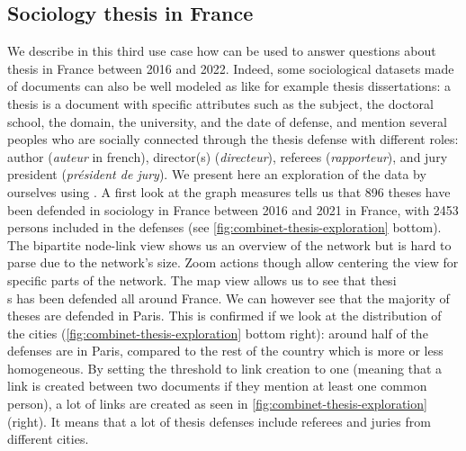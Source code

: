 \subsection{Sociology thesis in France}

We describe in this third use case how \name can be used to answer questions about thesis in France between 2016 and 2022.
Indeed, some sociological datasets made of documents can also be well modeled as \modelplural like for example thesis dissertations: a thesis is a document with specific attributes such as the subject, the doctoral school, the domain, the university, and the date of defense, and mention several peoples who are socially connected through the thesis defense with different roles: author (\textit{auteur} in french), director(s) (\textit{directeur}), referees (\textit{rapporteur}), and jury president (\textit{président de jury}).
We present here an exploration of the data by ourselves using \name.
A first look at the graph measures tells us that 896 theses have been defended in sociology in France between 2016 and 2021 in France, with 2453 persons included in the defenses (see \autoref{fig:combinet-thesis-exploration} bottom).
The bipartite node-link view shows us an overview of the network but is hard to parse due to the network's size.
Zoom actions though allow centering the view for specific parts of the network.
The map view allows us to see that thesi\d\\s has been defended all around France.
We can however see that the majority of theses are defended in Paris.
This is confirmed if we look at the distribution of the cities (\autoref{fig:combinet-thesis-exploration} bottom right): around half of the defenses are in Paris, compared to the rest of the country which is more or less homogeneous.
By setting the threshold to link creation to one (meaning that a link is created between two documents if they mention at least one common person), a lot of links are created as seen in \autoref{fig:combinet-thesis-exploration} (right).
It means that a lot of thesis defenses include referees and juries from different cities.


